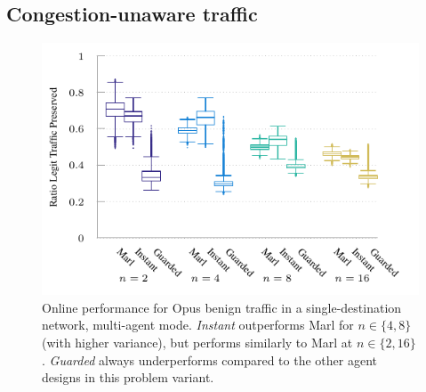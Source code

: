 \documentclass[10pt, times, comsoc]{IEEEtran}
\begin{document}
\subsection{Congestion-unaware traffic}
%	
%	
\begin{figure}
	\centering
	\includegraphics[width=0.95\linewidth]{../plots/tnsm-udp-box-separate}
	
	\caption{
		Online performance for Opus benign traffic in a single-destination network, multi-agent mode.
		\emph{Instant} outperforms Marl for $n \in \{4, 8\}$ (with higher variance), but performs similarly to Marl at $n\in \{2, 16\}$.
		\emph{Guarded} always underperforms compared to the other agent designs in this problem variant.
		\label{fig:udp-tree-box}
	}
\end{figure}
\end{document}
